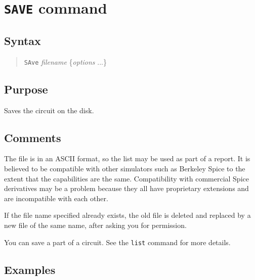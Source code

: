 \section{{\tt SAVE} command}
\subsection{Syntax}
\begin{verse}
{\tt SAve} {\it filename} \{{\it options} ...\}
\end{verse}
\subsection{Purpose}

Saves the circuit on the disk.
\subsection{Comments}

The file is in an ASCII format, so the list may be used as part of a
report.  It is believed to be compatible with other simulators such as 
Berkeley Spice to the extent that the capabilities are the same.  
Compatibility with commercial Spice derivatives may be a problem because
they all have proprietary extensions and are incompatible with each other.

If the file name specified already exists, the old file is deleted and
replaced by a new file of the same name, after asking you for permission.

You can save a part of a circuit.  See the {\tt list} command for more details.
\subsection{Examples}

